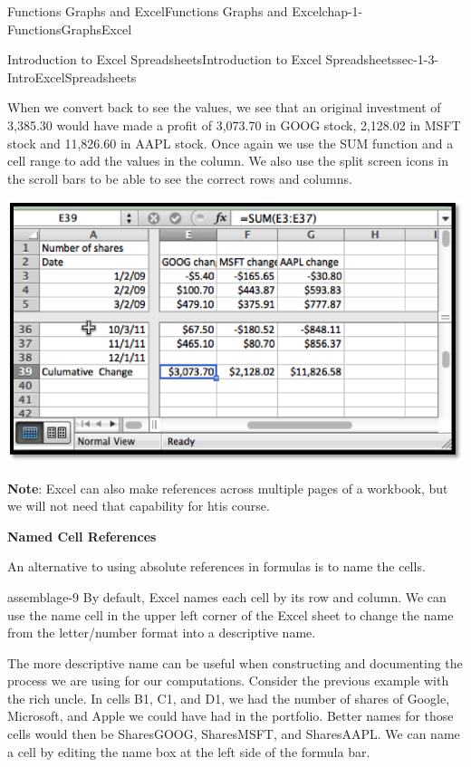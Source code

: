 \documentclass[oneside,10pt,]{book}
\newcommand{\terminology}[1]{\textbf{#1}}
\numberwithin{equation}{section}
\begin{document}
\begin{chapterptx}{Functions Graphs and Excel}{}{Functions Graphs and Excel}{}{}{chap-1-FunctionsGraphsExcel}
\begin{sectionptx}{Introduction to Excel Spreadsheets}{}{Introduction to Excel Spreadsheets}{}{}{sec-1-3-IntroExcelSpreadsheets}
\par
\hypertarget{p-258}{}%
When we convert back to see the values, we see that an original investment of \textdollar{}3,385.30 would have made a profit of \textdollar{}3,073.70 in GOOG stock, \textdollar{}2,128.02 in MSFT stock and \textdollar{}11,826.60 in AAPL stock.  Once again we use the SUM function and a cell range to add the values in the column.  We also use the split screen icons in the scroll bars to be able to see the correct rows and columns.%
\begin{sidebyside}{1}{0.1}{0.1}{0}%
\begin{sbspanel}{0.8}%
\includegraphics[width=1\linewidth]{images/sec1-3-13.png}
\end{sbspanel}%
\end{sidebyside}%
\par
\hypertarget{p-259}{}%
\terminology{Note}: Excel can also make references across multiple pages of a workbook, but we will not need that capability for htis course.%
\par
\hypertarget{p-260}{}%
\terminology{Named Cell References}%
\par
\hypertarget{p-261}{}%
An alternative to using absolute references in formulas is to name the cells.%
\begin{assemblage}{}{assemblage-9}%
\hypertarget{p-262}{}%
By default, Excel names each cell by its row and column.  We can use the name cell in the upper left corner of the Excel sheet to change the name from the letter\slash{}number format into a descriptive name.%
\end{assemblage}
\hypertarget{p-263}{}%
The more descriptive name can be useful when constructing and documenting the process we are using for our computations.  Consider the previous example with the rich uncle.  In cells B1, C1, and D1, we had the number of shares of Google, Microsoft, and Apple we could have had in the portfolio.  Better names for those cells would then be SharesGOOG, SharesMSFT, and SharesAAPL.  We can name a cell by editing the name box at the left side of the formula bar.%

\end{sectionptx}
\end{chapterptx}
\end{document}

